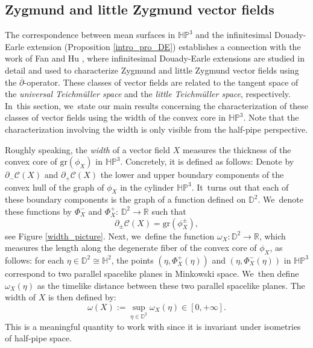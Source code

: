 \documentclass[11pt]{article}
\theoremstyle{plain}
\theoremstyle{definition}
\newcommand{\HP}{\mathbb{HP}^3}
\begin{document}
\subsection{Zygmund and little Zygmund vector fields}

The correspondence between mean surfaces in \(\HP \) and the infinitesimal Douady-Earle extension (Proposition \ref{intro_pro_DE}) establishes a connection with the work of Fan and Hu \cite{Fan_Hu_Little}, where infinitesimal Douady-Earle extensions are studied in detail and used to characterize Zygmund and little Zygmund vector fields using the \(\overline{\partial}\)-operator. These classes of vector fields are related to the tangent space of the \emph{universal Teichmüller space} and the \emph{little Teichmüller space}, respectively. In~this section, we~state our main results concerning the characterization of these classes of vector fields using the width of the convex core in \(\HP \). Note that the characterization involving the width is only visible from the half-pipe perspective.

Roughly speaking, the \emph{width} of a vector field \(X \) measures the thickness of the convex core of \(\mathrm{gr}(\phi_X) \) in \(\HP \). Concretely, it is defined as follows: Denote by \(\partial_{-}\mathcal{C}(X) \) and \(\partial_+\mathcal{C}(X) \) the lower and upper boundary components of the convex hull of the graph of \(\phi_X \) in the cylinder \(\HP \). It~turns out that each of these boundary components is the graph of a function defined on \(\mathbb{D}^2 \). We~denote these functions by \(\Phi_X^- \) and \(\Phi_X^+ \): \(\mathbb{D}^2 \to \mathbb{R} \) such that
\[
\partial_{\pm}\mathcal{C}(X) = \mathrm{gr}(\phi_X^{\pm}),
\]
see Figure \ref{width_picture}. Next, we~define the function \(\omega_X:\mathbb{D}^2\to\mathbb{R} \), which measures the length along the degenerate fiber of the convex core of \(\phi_X \), as follows: for each \(\eta \in \mathbb{D}^2 \cong \mathbb{H}^2 \), the points \((\eta,\Phi_X^+(\eta)) \) and \((\eta,\Phi_X^-(\eta)) \) in \(\HP \) correspond to two parallel spacelike planes in Minkowski space. We~then define \(\omega_X(\eta) \) as the timelike distance between these two parallel spacelike planes. The width of \(X \) is then defined by:
\[
\omega(X) := \sup_{\eta\in\mathbb{D}^2} \omega_X(\eta)\in[0,+\infty].
\]
This is a meaningful quantity to work with since it is invariant under isometries of half-pipe space.
\end{document}
